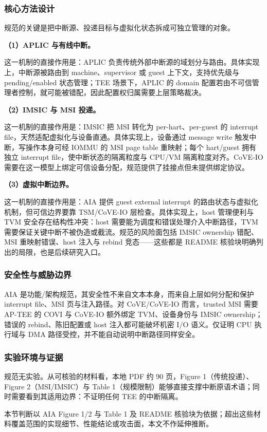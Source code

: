 \documentclass[11pt]{ctexart}
\begin{document}
\subsubsection{核心方法设计}
规范的关键是把中断源、投递目标与虚拟化状态拆成可独立管理的对象。\par
\noindent\textbf{（1）APLIC 与有线中断。}\par
这一机制的直接作用是：APLIC 负责传统外部中断源的域划分与路由。具体实现上，中断源被路由到 machine、supervisor 或 guest 上下文，支持优先级与 pending/enabled 状态管理；TEE 场景下，APLIC 的 domain 配置若由不可信管理者控制，就可能被错配，因此配置权归属需要上层策略裁决。\par
\noindent\textbf{（2）IMSIC 与 MSI 投递。}\par
这一机制的直接作用是：IMSIC 把 MSI 转化为 per-hart、per-guest 的 interrupt file，天然适配虚拟化与设备直通。具体实现上，设备通过 message write 触发中断，写操作本身可经 IOMMU 的 MSI page table 重映射；每个 hart/guest 拥有独立 interrupt file，使中断状态的隔离粒度与 CPU/VM 隔离粒度对齐。CoVE-IO 需要在这一模型上绑定可信设备分配，规范提供了挂接点但未提供绑定协议。\par
\noindent\textbf{（3）虚拟中断边界。}\par
这一机制的直接作用是：AIA 提供 guest external interrupt 的路由状态与虚拟化机制，但可信边界要靠 TSM/CoVE-IO 层检查。具体实现上，host 管理便利与 TVM 安全存在结构性冲突：host 需要能为调度和错误处理介入中断路径，TVM 需要保证关键中断不被伪造或截流。规范的风险面包括 IMSIC ownership 错配、MSI 重映射错误、host 注入与 rebind 竞态——这些都是 README 核验块明确列出的局限，也是后续研究入口。\par
\subsubsection{安全性与威胁边界}
AIA 是功能/架构规范，其安全性不来自文本本身，而来自上层如何分配和保护 interrupt file、MSI 页与注入路径。对 CoVE/CoVE-IO 而言，trusted MSI 需要 AP-TEE 的 COVI 与 CoVE-IO 额外绑定 TVM、设备身份与 IMSIC ownership；错误的 rebind、陈旧配置或 host 注入都可能破坏机密 I/O 语义。仅证明 CPU 执行域与 DMA 路径受控，并不能自动说明中断路径同样安全。\par
\subsubsection{实验环境与证据}
规范无实验。从可核验的材料看，本地 PDF 约 90 页，Figure 1（传统投递）、Figure 2（MSI/IMSIC）与 Table 1（规模限制）能够直接支撑中断原语术语；同时需要看到其适用边界：不证明任何 TEE 的中断隔离。\par
本节判断以 AIA Figure 1/2 与 Table 1 及 README 核验块为依据；超出这些材料覆盖范围的实现细节、性能结论或攻击面，本文不作延伸推断。\par
\end{document}
